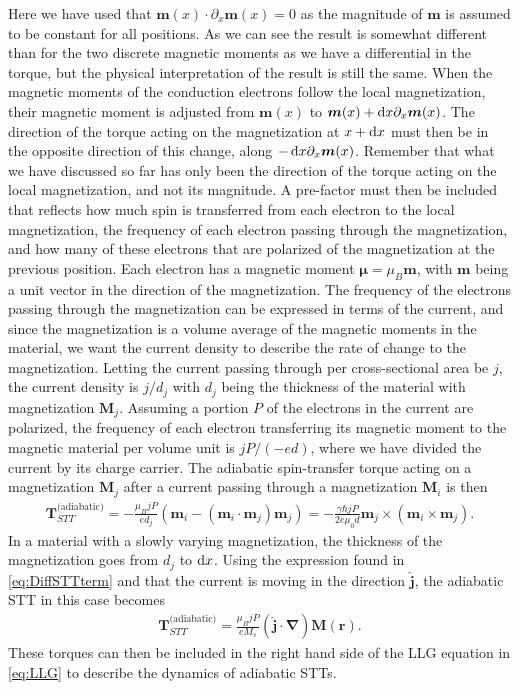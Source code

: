 Here we have used that $\mathbold{m}(x)\cdot\partial_x \mathbold{m}(x) = 0$ as the magnitude of $\mathbold{m}$ is assumed to be constant for all positions. As we can see the result is somewhat different than for the two discrete magnetic moments as we have a differential in the torque, but the physical interpretation of the result is still the same. When the magnetic moments of the conduction electrons follow the local magnetization, their magnetic moment is adjusted from $\mathbold{m}(x)$ to $\mathbold{m}(x) + \d x \partial_x \mathbold{m}(x)$. The direction of the torque acting on the magnetization at $x +\operatorname{d}\!{x}$ must then be in the opposite direction of this change, along $-\d x \partial_x \mathbold{m}(x)$. Remember that what we have discussed so far has only been the direction of the torque acting on the local magnetization, and not its magnitude. A pre-factor must then be included that reflects how much spin is transferred from each electron to the local magnetization, the frequency of each electron passing through the magnetization, and how many of these electrons that are polarized of the magnetization at the previous position. Each electron has a magnetic moment $\mathbold{\mu} = \mu_B \mathbold{m}$, with $\mathbold{m}$ being a unit vector in the direction of the magnetization. The frequency of the electrons passing through the magnetization can be expressed in terms of the current, and since the magnetization is a volume average of the magnetic moments in the material, we want the current density to describe the rate of change to the magnetization. Letting the current passing through per cross-sectional area be $j$, the current density is $j/d_j$ with $d_j$ being the thickness of the material with magnetization $\mathbold{M}_j$. Assuming a portion $P$ of the electrons in the current are polarized, the frequency of each electron transferring its magnetic moment to the magnetic material per volume unit is $jP/(-ed)$, where we have divided the current by its charge carrier. The adiabatic spin-transfer torque acting on a magnetization $\mathbold{M}_j$ after a current passing through a magnetization $\mathbold{M}_i$ is then
\begin{align}
    \mathbold{T}_{STT}^{\textrm{(adiabatic)}} = -\frac{\mu_B j P}{e d_j} (\mathbold{m}_i-(\mathbold{m}_i\cdot\mathbold{m}_j)\mathbold{m}_j)
    = -\frac{\gamma \hbar jP}{2 e \mu_0 d}\mathbold{m}_j\times\left(\mathbold{m}_i\times\mathbold{m}_j\right).
    \label{eq:STT_Adiabatic_Macro}
\end{align}
In a material with a slowly varying magnetization, the thickness of the magnetization goes from $d_j$ to $\operatorname{d}\!{x}$. Using the expression found in \eqref{eq:DiffSTTterm} and that the current is moving in the direction $\mathbold{\hat{j}}$, the adiabatic STT in this case becomes
\begin{align}
 \mathbold{T}_{STT}^{\textrm{(adiabatic)}} = \frac{\mu_B j P}{e M_s} (\mathbold{\hat{j}}\cdot\mathbold{\nabla})\mathbold{M}(\mathbold{r}). \label{eq:AdSTTnonuniform}
\end{align}
These torques can then be included in the right hand side of the LLG equation in \eqref{eq:LLG} to describe the dynamics of adiabatic STTs.

